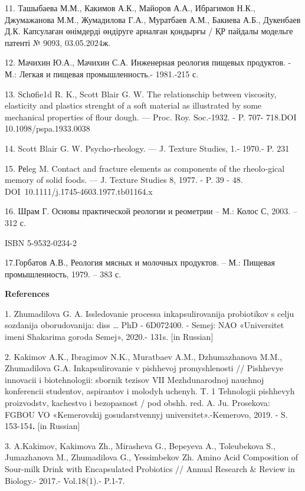11. Ташыбаева М.М., Какимов А.К., Майоров А.А., Ибрагимов Н.К.,
Джумажанова М.М., Жумадилова Г.А., Муратбаев А.М., Бакиева А.Б.,
Дукенбаев Д.К. Капсулаған өнімдерді өндіруге арналған қондырғы / ҚР
пайдалы модельге патенті № 9093, 03.05.2024ж.

12. Мачихин Ю.А., Мачихин С.А. Инженерная реология пищевых продуктов. -
М.: Легкая и пищевая промышленность.- 1981.-215 с.

13. Sсhоfie1d R. K., Scott Blair G. W. The relationschip between
viscosity, elasticity and plastics strenght of a soft material as
illustrated by some mechanical properties of flour dough. --- Proc. Roy.
Soc.-1932. - P. 707- 718.DOI 10.1098/pspa.1933.0038

14. Scott Blair G. W. Psycho-rheology. --- J. Texture Studies, 1.-
1970.- P. 231

15. Реleg M. Contact and fracture elements as components of the
rheolo-gical memory of solid foods. --- J. Texture Studies 8, 1977. - P.
39 - 48. DOI~10.1111/j.1745-4603.1977.tb01164.x

16. Шрам Г. Основы практической реологии и реометрии -- М.: Колос С,
2003. -- 312 с.

ISBN 5-9532-0234-2

17.Горбатов А.В., Реология мясных и молочных продуктов. -- М.: Пищевая
промышленность, 1979. -- 383 с.

{\bfseries References}

1. Zhumadilova G. A. Issledovanie processa inkapsulirovanija probiotikov
s cel\textquotesingle ju sozdanija oborudovanija: diss \ldots{} PhD -
6D072400. - Semej: NAO «Universitet imeni Shakarima goroda Semej»,
2020.- 131s. {[}in Russian{]}

2. Kakimov A.K., Ibragimov N.K., Muratbaev A.M., Dzhumazhanova M.M.,
Zhumadilova G.A. Inkapsulirovanie v pishhevoj promyshlenosti //
Pishhevye innovacii i biotehnologii: sbornik tezisov VII Mezhdunarodnoj
nauchnoj konferencii studentov, aspirantov i molodyh uchenyh. T. 1
Tehnologii pishhevyh proizvodstv, kachestvo i
bezopasnost\textquotesingle{} / pod obshh. red. A. Ju. Prosekova: FGBOU
VO «Kemerovskij gosudarstvennyj universitet».-Kemerovo, 2019. - S.
153-154{\bfseries .} {[}in Russian{]}

3. A.Kakimov, Kakimova Zh., Mirasheva G., Bepeyeva A., Toleubekova S.,
Jumazhanova M., Zhumadilova G., Yessimbekov Zh. Amino Acid Composition
of Sour-milk Drink with Encapsulated Probiotics // Annual Research \&
Review in Biology.- 2017.- Vol.18(1).- P.1-7.

